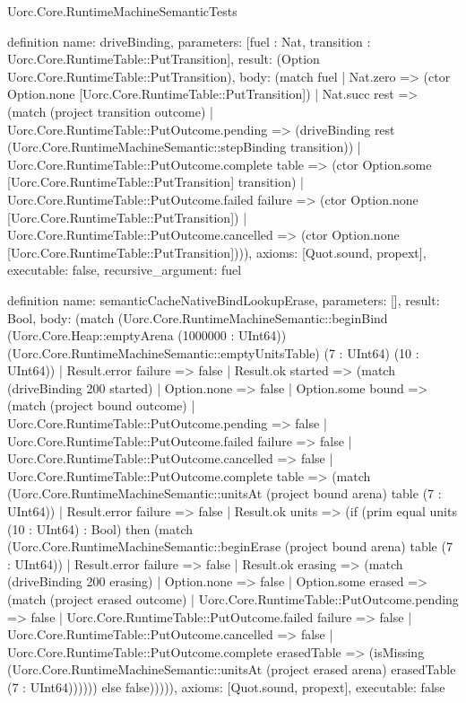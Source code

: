 \begin{lexlean}{Uorc.Core.RuntimeMachineSemanticTests}
\begin{semanticmodule}
definition{
  name: driveBinding,
  parameters: [fuel : Nat, transition : Uorc.Core.RuntimeTable::PutTransition],
  result: (Option Uorc.Core.RuntimeTable::PutTransition),
  body: (match fuel
    | Nat.zero => (ctor Option.none [Uorc.Core.RuntimeTable::PutTransition])
    | Nat.succ rest => (match (project transition outcome)
      | Uorc.Core.RuntimeTable::PutOutcome.pending => (driveBinding rest (Uorc.Core.RuntimeMachineSemantic::stepBinding transition))
      | Uorc.Core.RuntimeTable::PutOutcome.complete table => (ctor Option.some [Uorc.Core.RuntimeTable::PutTransition] transition)
      | Uorc.Core.RuntimeTable::PutOutcome.failed failure => (ctor Option.none [Uorc.Core.RuntimeTable::PutTransition])
      | Uorc.Core.RuntimeTable::PutOutcome.cancelled => (ctor Option.none [Uorc.Core.RuntimeTable::PutTransition]))),
  axioms: [Quot.sound, propext],
  executable: false,
  recursive_argument: fuel
}

definition{
  name: semanticCacheNativeBindLookupErase,
  parameters: [],
  result: Bool,
  body: (match (Uorc.Core.RuntimeMachineSemantic::beginBind (Uorc.Core.Heap::emptyArena (1000000 : UInt64)) (Uorc.Core.RuntimeMachineSemantic::emptyUnitsTable) (7 : UInt64) (10 : UInt64))
    | Result.error failure => false
    | Result.ok started => (match (driveBinding 200 started)
      | Option.none => false
      | Option.some bound => (match (project bound outcome)
        | Uorc.Core.RuntimeTable::PutOutcome.pending => false
        | Uorc.Core.RuntimeTable::PutOutcome.failed failure => false
        | Uorc.Core.RuntimeTable::PutOutcome.cancelled => false
        | Uorc.Core.RuntimeTable::PutOutcome.complete table => (match (Uorc.Core.RuntimeMachineSemantic::unitsAt (project bound arena) table (7 : UInt64))
          | Result.error failure => false
          | Result.ok units => (if (prim equal units (10 : UInt64) : Bool) then (match (Uorc.Core.RuntimeMachineSemantic::beginErase (project bound arena) table (7 : UInt64))
            | Result.error failure => false
            | Result.ok erasing => (match (driveBinding 200 erasing)
              | Option.none => false
              | Option.some erased => (match (project erased outcome)
                | Uorc.Core.RuntimeTable::PutOutcome.pending => false
                | Uorc.Core.RuntimeTable::PutOutcome.failed failure => false
                | Uorc.Core.RuntimeTable::PutOutcome.cancelled => false
                | Uorc.Core.RuntimeTable::PutOutcome.complete erasedTable => (isMissing (Uorc.Core.RuntimeMachineSemantic::unitsAt (project erased arena) erasedTable (7 : UInt64)))))) else false))))),
  axioms: [Quot.sound, propext],
  executable: false
}


\end{semanticmodule}
\end{lexlean}
